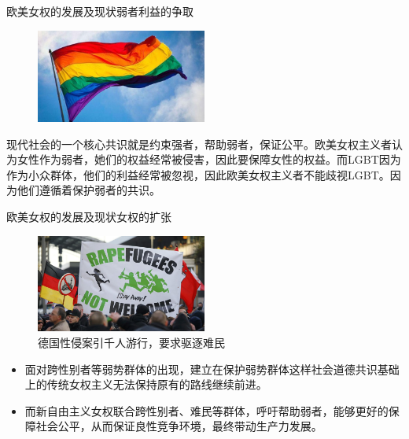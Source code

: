 \documentclass{beamer}
\begin{document}
	\begin{frame}{欧美女权的发展及现状}{弱者利益的争取}
		\begin{figure}
			\centering
			\includegraphics[width=0.5\textwidth]{img/图片6.jpg}
		\end{figure}

		现代社会的一个核心共识就是约束强者，帮助弱者，保证公平。欧美女权主义者认为女性作为弱者，她们的权益经常被侵害，因此要保障女性的权益。而LGBT因为作为小众群体，他们的利益经常被忽视，因此欧美女权主义者不能歧视LGBT。因为他们遵循着保护弱者的共识。

	\end{frame}

	\begin{frame}{欧美女权的发展及现状}{女权的扩张}
		\begin{figure}
			\centering
			\includegraphics[width=0.5\textwidth]{img/图片13.png}
			\caption{德国性侵案引千人游行，要求驱逐难民}
		\end{figure}
		
		\begin{itemize}
			\item 面对跨性别者等弱势群体的出现，建立在保护弱势群体这样社会道德共识基础上的传统女权主义无法保持原有的路线继续前进。
			\item 而新自由主义女权联合跨性别者、难民等群体，呼吁帮助弱者，能够更好的保障社会公平，从而保证良性竞争环境，最终带动生产力发展。
		\end{itemize}
	
	\end{frame}
\end{document}
